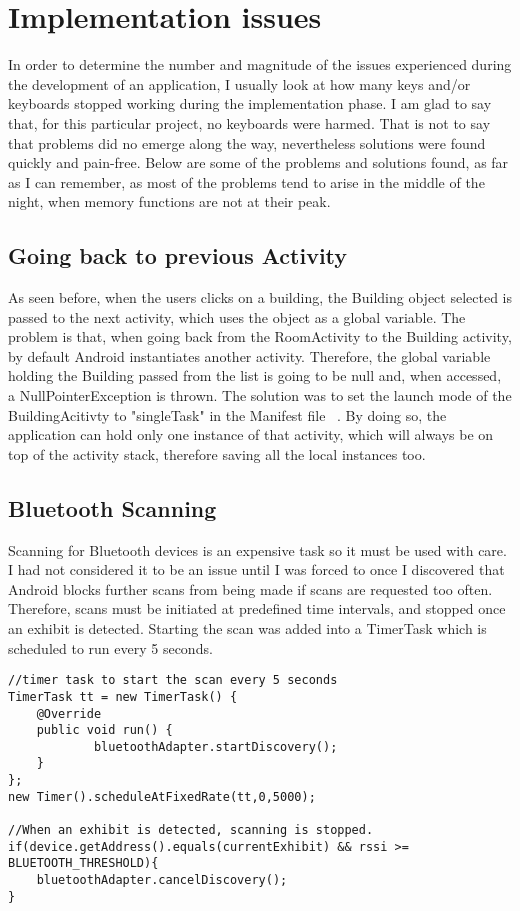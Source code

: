 \section{Implementation issues}
In order to determine the number and magnitude of the issues experienced during the development of an application, I usually look at how many keys and/or keyboards stopped working during the implementation phase. I am glad to say that, for this particular project, no keyboards were harmed. That is not to say that problems did no emerge along the way, nevertheless solutions were found quickly and pain-free. Below are some of the problems and solutions found, as far as I can remember, as most of the problems tend to arise in the middle of the night, when memory functions are not at their peak.

\subsection{Going back to previous Activity}
As seen before, when the users clicks on a building, the Building object selected is passed to the next activity, which uses the object as a global variable. The problem is that, when going back from the RoomActivity to the Building activity, by default Android instantiates another activity. Therefore, the global variable holding the Building passed from the list is going to be null and, when accessed, a NullPointerException is thrown. The solution was to set the launch mode of the BuildingAcitivty to "singleTask" in the Manifest file ~\cite{activity-element}. By doing so, the application can hold only one instance of that activity, which will always be on top of the activity stack, therefore saving all the local instances too.

\subsection{Bluetooth Scanning}
Scanning for Bluetooth devices is an expensive task so it must be used with care. I had not considered it to be an issue until I was forced to once I discovered that Android blocks further scans from being made if scans are requested too often. Therefore, scans must be initiated at predefined time intervals, and stopped once an exhibit is detected. Starting the scan was added into a TimerTask which is scheduled to run every 5 seconds.
\begin{lstlisting}
//timer task to start the scan every 5 seconds
TimerTask tt = new TimerTask() {
	@Override
    public void run() {
    		bluetoothAdapter.startDiscovery();
    }
};
new Timer().scheduleAtFixedRate(tt,0,5000);
        
//When an exhibit is detected, scanning is stopped.
if(device.getAddress().equals(currentExhibit) && rssi >= BLUETOOTH_THRESHOLD){
	bluetoothAdapter.cancelDiscovery();
}                      
        
\end{lstlisting}

